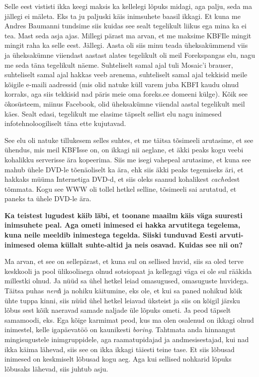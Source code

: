 Selle eest vististi ikka keegi maksis ka kellelegi lõpuks midagi, aga palju, 
seda ma jällegi ei mäleta. Eks ta ju paljuski käis inimsuhete baasil ikkagi. Et 
kuna me Andres Baumanni tundsime siis kuidas see 
sealt tegelikult  liikus ega mina ka ei tea. Mast seda asja 
ajas. Millegi pärast ma arvan, et  me maksime KBFIle mingit mingit raha ka 
selle eest. Jällegi. Aasta oli siis minu teada üheksakümmend viis ja 
üheksakümne viiendast aastast alates tegelikult oli meil 
Forekspangas elu, nagu me seda täna tegelikult näeme. 
Suhteliselt samal ajal tuli Mosaic'i brauser, suhteliselt samal ajal hakkas veeb arenema, 
suhteliselt samal ajal tekkisid meile kõigile e-maili aadressid (mis olid 
natuke küll varem juba KBFI kaudu olnud korraks, aga siis tekkisid nad päris 
meie oma foreks.ee domeeni külge). Kõik see ökosüsteem, miinus Facebook, olid 
üheksakümne viiendal aastal tegelikult meil käes. Sealt edasi,  tegelikult me 
elasime täpselt sellist elu nagu inimesed infotehnoloogiliselt täna ette 
kujutavad. 

See elu oli natuke tillukesem selles suhtes, et me täitsa tõsimeeli arutasime, 
et see ühendus, mis meil KBFIsse on, on ikkagi nii aeglane, et äkki peaks kogu 
veebi kohalikku serverisse ära kopeerima. Siis me isegi vahepeal arutasime, et 
kuna see mahub ühele DVD-le tõenäoliselt ka ära, ehk siis äkki peaks tegemiseks 
äri, et hakkaks müüma Internetiga DVD-d, et siis oleks saanud kohalikest 
\emph{cache}dest tõmmata. Kogu see WWW oli tollel hetkel selline, tõsimeeli sai 
arutatud, et paneks ta ühele DVD-le ära. 

\textbf{Ka teistest lugudest käib läbi, et toonane maailm käis väga suuresti 
inimsuhete peal. Aga ometi inimesed ei hakka arvutitega tegelema, kuna neile 
meeldib inimestega tegelda. Siiski tunduvad Eesti arvuti-inimesed olema küllalt 
suhte-altid ja neis osavad. Kuidas see nii on?}

Ma arvan, et see on sellepärast, et kuna sul on sellised huvid, siis sa oled 
terve keskkooli ja pool ülikooliaega olnud sotsiopaat ja kellegagi väga ei ole 
sul rääkida millestki olnud. Ja nüüd sa ühel hetkel leiad omasugused, 
omasuguste huvidega. Täitsa puhas \emph{nerd}i ja nohiku käitumine, eks ole, et 
kui sa paned  nohikud  kõik ühte tuppa kinni, siis nüüd ühel hetkel leiavad 
üksteist ja siis on kõigil järsku lõbus sest kõik naeravad samade naljade üle 
lõpuks ometi. Ja peod täpselt samamoodi, eks. Ega kõige karmimat peod, kus ma 
olen  osalenud on ikkagi olnud inimestel, kelle igapäevatöö on kaunikesti 
\emph{boring}. Tahtmata anda hinnangut mingisugustele inimgruppidele, aga   
raamatupidajad ja  andmesisestajad, kui nad ikka käima lähevad, siis see on 
ikka ikkagi täiesti teine tase. Et siis lõbusad inimesed on keskmiselt lõbusad 
kogu aeg. Aga kui sellised nohkarid lõpuks lõbusaks lähevad, siis juhtub asju.

